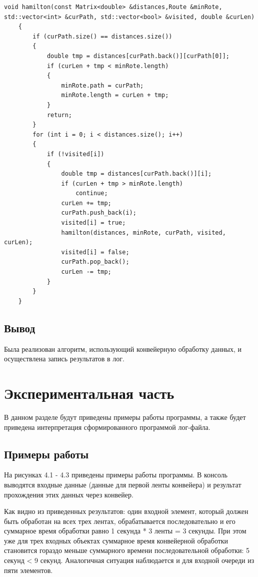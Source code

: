 \documentclass[a4paper,12pt]{report}
\begin{document}
\begin{lstlisting}[caption=Рекурсивная функция алгоритма полного перебора]
    void hamilton(const Matrix<double> &distances,Route &minRote, std::vector<int> &curPath, std::vector<bool> &visited, double &curLen)
    {
        if (curPath.size() == distances.size())
        {
            double tmp = distances[curPath.back()][curPath[0]];
            if (curLen + tmp < minRote.length)
            {
                minRote.path = curPath;
                minRote.length = curLen + tmp;
            }
            return;
        }
        for (int i = 0; i < distances.size(); i++)
        {
            if (!visited[i])
            {
                double tmp = distances[curPath.back()][i];
                if (curLen + tmp > minRote.length)
                    continue;
                curLen += tmp;
                curPath.push_back(i);
                visited[i] = true;
                hamilton(distances, minRote, curPath, visited, curLen);
                visited[i] = false;
                curPath.pop_back();
                curLen -= tmp;
            }
        }
    }
\end{lstlisting}

\section{Вывод}
Была реализован алгоритм, использующий конвейерную обработку данных, и осуществлена запись результатов в лог.

\chapter{Экспериментальная часть}
\hspace{0.6cm}В данном разделе будут приведены примеры работы программы, а также будет приведена интерпретация сформированного программой лог-файла.
\section{Примеры работы}
\hspace{0.6cm}На рисунках 4.1 - 4.3 приведены примеры работы программы. В консоль выводятся входные данные (данные для первой ленты конвейера) и результат прохождения этих данных через конвейер.


Как видно из приведенных результатов: один входной элемент, который должен быть обработан на всех трех лентах, обрабатывается последовательно и его суммарное время обработки равно 1 секунда * 3 ленты = 3 секунды. При этом уже для трех входных объектах суммарное время конвейерной обработки становится гораздо меньше суммарного времени последовательной обработки: 5 секунд < 9 секунд. Аналогичная ситуация наблюдается и для входной очереди из пяти элементов.
\end{document}

